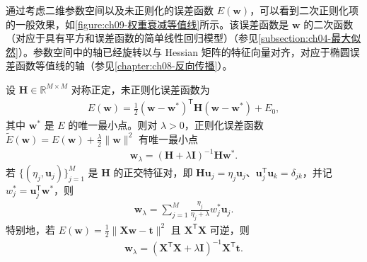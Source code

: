 \documentclass[../../main.tex]{subfiles}
\begin{document}
通过考虑二维参数空间以及未正则化的误差函数 $E(\boldsymbol{w})$，可以看到二次正则化项的一般效果，如\cref{figure:ch09-权重衰减等值线}所示。该误差函数是 $\boldsymbol{w}$ 的二次函数（对应于具有平方和误差函数的简单线性回归模型）（参见\cref{subsection:ch04-最大似然}）。参数空间中的轴已经旋转以与 Hessian 矩阵的特征向量对齐，对应于椭圆误差函数等值线的轴（参见\cref{chapter:ch08-反向传播}）。

\begin{theorem}[$L_{2}$ 正则化的闭式解]\label{theorem:ch09-L2闭式解}
设 $\boldsymbol{H}\in\mathbb{R}^{M\times M}$ 对称正定，未正则化误差函数为
\begin{align*}
E(\boldsymbol{w})=\frac{1}{2}(\boldsymbol{w}-\boldsymbol{w}^{*})^{\mathsf T}\boldsymbol{H}(\boldsymbol{w}-\boldsymbol{w}^{*})+E_{0},
\end{align*}
其中 $\boldsymbol{w}^{*}$ 是 $E$ 的唯一最小点。则对 $\lambda>0$，正则化误差函数 $\widetilde{E}(\boldsymbol{w})=E(\boldsymbol{w})+\frac{\lambda}{2}\|\boldsymbol{w}\|^{2}$ 有唯一最小点
\begin{align*}
\boldsymbol{w}_{\lambda}=(\boldsymbol{H}+\lambda\boldsymbol{I})^{-1}\boldsymbol{H}\boldsymbol{w}^{*}.
\end{align*}
若 $\{(\eta_{j},\boldsymbol{u}_{j})\}_{j=1}^{M}$ 是 $\boldsymbol{H}$ 的正交特征对，即 $\boldsymbol{H}\boldsymbol{u}_{j}=\eta_{j}\boldsymbol{u}_{j}$、$\boldsymbol{u}_{j}^{\mathsf T}\boldsymbol{u}_{k}=\delta_{jk}$，并记 $w_{j}^{*}=\boldsymbol{u}_{j}^{\mathsf T}\boldsymbol{w}^{*}$，则
\begin{align*}
\boldsymbol{w}_{\lambda}=\sum_{j=1}^{M}\frac{\eta_{j}}{\eta_{j}+\lambda}w_{j}^{*}\boldsymbol{u}_{j}.
\end{align*}
特别地，若 $E(\boldsymbol{w})=\frac{1}{2}\|\boldsymbol{X}\boldsymbol{w}-\boldsymbol{t}\|^{2}$ 且 $\boldsymbol{X}^{\mathsf T}\boldsymbol{X}$ 可逆，则
\begin{align*}
\boldsymbol{w}_{\lambda}=(\boldsymbol{X}^{\mathsf T}\boldsymbol{X}+\lambda\boldsymbol{I})^{-1}\boldsymbol{X}^{\mathsf T}\boldsymbol{t}.
\end{align*}
\end{theorem}
\end{document}
